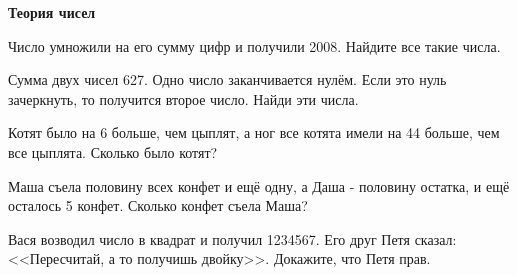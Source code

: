 \documentclass{article}
\begin{document}
    \large

    \begin{center}
        \textbf{Теория чисел}
    \end{center}


    \begin{enumerate_boxed}

        \item Число умножили на его сумму цифр и получили 2008.
        Найдите все такие числа.

        \item Сумма двух чисел 627.
        Одно число заканчивается нулём.
        Если это нуль зачеркнуть, то получится второе число.
        Найди эти числа.

        \item Котят было на 6 больше, чем цыплят, а ног все котята имели на 44 больше, чем все цыплята.
        Сколько было котят?

        \item Маша съела половину всех конфет и ещё одну, а Даша - половину остатка, и ещё осталось 5 конфет.
        Сколько конфет съела Маша?

        \item Вася возводил число в квадрат и получил 1234567.
        Его друг Петя сказал: <<Пересчитай, а то получишь двойку>>.
        Докажите, что Петя прав.

    \end{enumerate_boxed}
\end{document}
